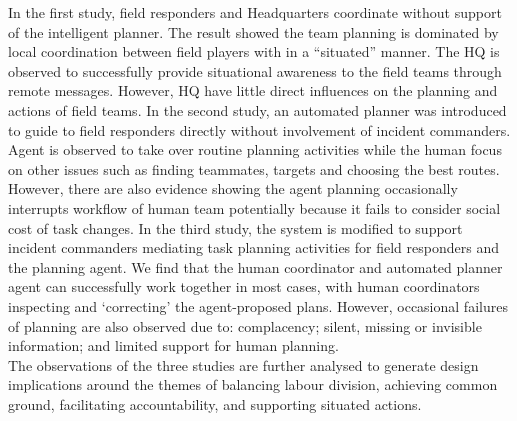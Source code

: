 In the first study, field responders and Headquarters coordinate without support of the intelligent planner. The result showed the team planning is dominated by local coordination between field players with in a ``situated'' manner. The HQ is observed to successfully provide situational awareness to the field teams through remote messages. However, HQ have little direct influences on the planning and actions of field teams. In the second study, an automated planner was introduced to guide to field responders directly without involvement of incident commanders. Agent is observed to take over routine planning activities while the human focus on other issues such as finding teammates, targets and choosing the best routes. However, there are also evidence showing the agent planning occasionally interrupts workflow of human team potentially because it fails to consider social cost of task changes. In the third study, the system is modified to support incident commanders mediating task planning activities for field responders and the planning agent. We find that the human coordinator and automated planner agent can successfully work together in most cases, with human coordinators inspecting and `correcting' the agent-proposed plans. However, occasional failures of planning are also observed due to: complacency; silent, missing or invisible information; and limited support for human planning. \\

The observations of the three studies are further analysed to generate design implications around the themes of balancing labour division, achieving common ground, facilitating accountability, and supporting situated actions.\\  


\endgroup			

\vfill